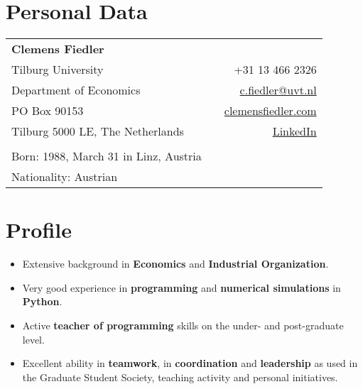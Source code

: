 \documentclass[a4paper,12pt]{article}
\begin{document}
\pagestyle{fancy}
\fancyhf{}
\lfoot{\today}
\renewcommand{\footrulewidth}{1pt}
\renewcommand{\headrulewidth}{0pt}



\par{\bigskip\par} %

\section{Personal Data}

\begin{tabular}{lp{2.5cm}r}
	\textbf{Clemens Fiedler}& & \\
Tilburg University 					& &+31 13 466 2326\\
Department of Economics				& &\href{c.fiedler@tilburguniversity.edu}{c.fiedler@uvt.nl}\\
PO Box 90153						& &\href{https://clemensfiedler.com/}{clemensfiedler.com}\\
Tilburg 5000 LE, The Netherlands	& &\href{https://www.linkedin.com/in/clemens-fiedler-2b5053149/}{LinkedIn}\\
& & \\
Born: 1988, March 31 in Linz, Austria & & \\
Nationality: Austrian & &
\end{tabular}\vspace{2em}

\section{Profile}

\begin{itemize}[noitemsep]
	\item Extensive background in \textbf{Economics} and \textbf{Industrial Organization}.
	\item Very good experience in \textbf{programming} and \textbf{numerical simulations} in \textbf{Python}.
	\item Active \textbf{teacher of programming} skills on the under- and post-graduate level.
	\item Excellent ability in \textbf{teamwork}, in \textbf{coordination} and \textbf{leadership} as used in the Graduate Student Society, teaching activity and personal initiatives.
\end{itemize}
\end{document}
